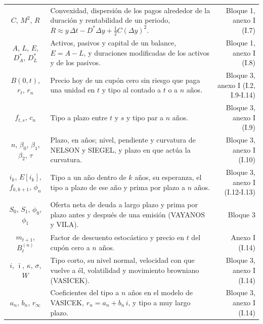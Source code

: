 \documentclass[10pt,a4paper]{article}
\begin{document}
\begin{longtable}{SMD}
$C$, $M^2$, $R$ & Convexidad, dispersión de los pagos alrededor de la duración y rentabilidad de un periodo, $R\approx y\,\Delta t-D^*\Delta y+\tfrac12 C(\Delta y)^2$. & Bloque 1, anexo I (I.7)\\
$A$, $L$, $E$, $D_A^*$, $D_L^*$ & Activos, pasivos y capital de un balance, $E=A-L$, y duraciones modificadas de los activos y de los pasivos. & Bloque 1, anexo I (I.8)\\
$B(0,t)$, $r_t$, $r_n$ & Precio hoy de un cupón cero sin riesgo que paga una unidad en $t$ y tipo al contado a $t$ o a $n$ años. & Bloque 3, anexo I (I.2, I.9-I.14)\\
$f_{t,s}$, $c_n$ & Tipo a plazo entre $t$ y $s$ y tipo par a $n$ años. & Bloque 3, anexo I (I.9)\\
$n$, $\beta_0$, $\beta_1$, $\beta_2$, $\tau$ & Plazo, en años; nivel, pendiente y curvatura de NELSON y SIEGEL, y plazo en que actúa la curvatura. & Bloque 3, anexo I (I.10)\\
$i_k$, $E[i_k]$, $f_{k,k+1}$, $\phi_n$ & Tipo a un año dentro de $k$ años, su esperanza, el tipo a plazo de ese año y prima por plazo a $n$ años. & Bloque 3, anexo I (I.12-I.13)\\
$S_0$, $S_1$, $\phi_0$, $\phi_1$ & Oferta neta de deuda a largo plazo y prima por plazo antes y después de una emisión (VAYANOS y VILA). & Bloque 3\\
$m_{t+1}$, $B_t^{(n)}$ & Factor de descuento estocástico y precio en $t$ del cupón cero a $n$ años. & Anexo I (I.14)\\
$i$, $\bar\imath$, $\kappa$, $\sigma$, $W$ & Tipo corto, su nivel normal, velocidad con que vuelve a él, volatilidad y movimiento browniano (VASICEK). & Bloque 3, anexo I (I.14)\\
$a_n$, $b_n$, $r_\infty$ & Coeficientes del tipo a $n$ años en el modelo de VASICEK, $r_n=a_n+b_n\,i$, y tipo a muy largo plazo. & Bloque 3, anexo I (I.14)\\
\end{longtable}
\end{document}
